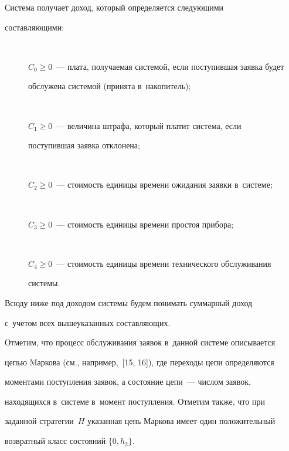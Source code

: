   


  Система получает доход, который определяется следу\-ющими 


составля\-ющими:


  \begin{description}


\item[\,]  $C_0\geq0$~--- плата, получаемая системой, если поступившая заявка будет 


обслужена системой (принята в~накопитель);


\item[\,]  


    $C_1\geq 0$~--- величина штрафа, который платит система, если 


поступившая заявка отклонена;


  \item[\,]


  $C_2\geq 0$~---  стоимость единицы времени ожидания заявки в~системе;


  \item[\,]


  $C_3\geq 0$~---  стоимость единицы времени простоя прибора;


  \item[\,]


  $C_4\geq 0$~---  стоимость единицы времени технического обслуживания 


системы.


\end{description}


  


  Всюду ниже под доходом системы будем понимать суммарный доход 


с~учетом всех вышеуказанных составляющих.


  


  Отметим, что процесс обслуживания заявок в~данной системе описывается 


цепью Mаркова (см., например,~[15, 16]), где переходы цепи определяются 


моментами поступления заявок, а состояние цепи~--- числом заявок, 


находящихся в~системе в~момент поступления. Отметим также, что при 


заданной стратегии~$H$ указанная цепь Маркова имеет один положительный 


возвратный класс состояний $\{0,h_2\}$.





